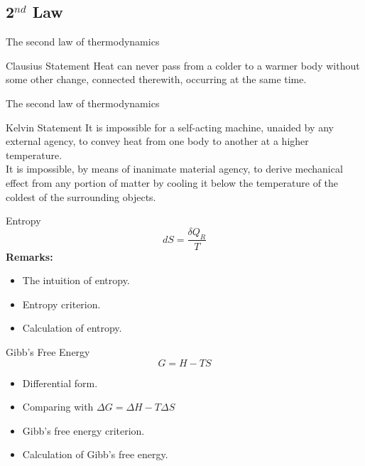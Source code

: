 \documentclass[12pt,compress]{beamer}
\begin{document}
\subsection{2$^{nd}$ Law}
\begin{frame}{The second law of thermodynamics}
    \begin{block}{Clausius Statement}
        Heat can never pass from a colder to a warmer body without some other change, connected therewith, occurring at the same time.
    \end{block}
\end{frame}
\begin{frame}{The second law of thermodynamics}
    \begin{block}{Kelvin Statement}
        It is impossible for a self-acting machine, unaided by any external agency, to convey heat from one body to another at a higher temperature. \\
        It is impossible, by means of inanimate material agency, to derive mechanical effect from any portion of matter by cooling it below the temperature of the coldest of the surrounding objects.
    \end{block}
\end{frame}
\begin{frame}{Entropy}
    \begin{equation}
        dS = \frac{\delta Q_R}{T}
    \end{equation}
    \textbf{Remarks:}
    \begin{itemize}
        \item The intuition of entropy.
        \item Entropy criterion.
        \item Calculation of entropy.
    \end{itemize}
\end{frame}
\begin{frame}{Gibb's Free Energy}
    \begin{equation}
        G = H - TS
    \end{equation}
    \begin{itemize}
        \item Differential form.
        \item Comparing with $\Delta G = \Delta H - T \Delta S$
        \item Gibb's free energy criterion.
        \item Calculation of Gibb's free energy.
    \end{itemize}
\end{frame}
\end{document}
